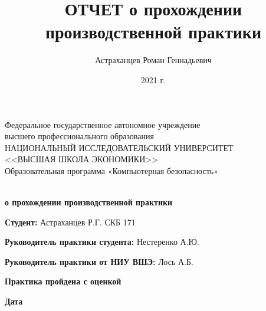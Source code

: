 \documentclass[a4paper,12pt]{article}
\author{Астраханцев Роман Геннадьевич}
\title{ОТЧЕТ о прохождении производственной практики}
\date{2021 г.}
\theoremstyle{definition}
\begin{document}
	
	\thispagestyle{empty}
	\begin{center}
		Федеральное государственное автономное учреждение \\ высшего профессионального образования \\

		НАЦИОНАЛЬНЫЙ ИССЛЕДОВАТЕЛЬСКИЙ УНИВЕРСИТЕТ \\ <<ВЫСШАЯ ШКОЛА ЭКОНОМИКИ>> \\
		\vspace{2ex}
		Образовательная программа «Компьютерная безопасность» \\
	\end{center}
	\begin{center}
		\vspace{15ex}
		\textbf{ \\ о прохождении производственной практики}
	\end{center}

	\vspace{10ex}

	\textbf{Студент:} Астраханцев Р.Г. СКБ 171 \underline{\hspace{5em} \vspace{-1mm}} 
		
	\textbf{Руководитель практики студента:} Нестеренко А.Ю. \underline{\hspace{5em} \vspace{-1mm}}  
		
	\textbf{Руководитель практики от НИУ ВШЭ:} Лось А.Б. \underline{\hspace{5em}  \vspace{-1mm}} 

	\vspace{8ex}
	\hspace{0.4\linewidth} \textbf{Практика пройдена с оценкой \underline{\hspace{5em} \vspace{-1mm}} }

	\vspace{5ex}
	\hspace{0.4\linewidth} \textbf{Дата \underline{\hspace{8em} \vspace{-1mm}} }
\end{document}
